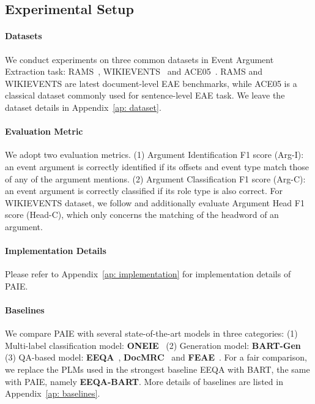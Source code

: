 \subsection{Experimental Setup}
\paragraph{Datasets}
We conduct experiments on three common datasets in Event Argument Extraction task: RAMS~\cite{ebner-etal-2020-multi}, WIKIEVENTS~\cite{li-etal-2021-document} and ACE05~\cite{doddington-etal-2004-automatic}. RAMS and WIKIEVENTS are latest document-level EAE benchmarks, while ACE05 is a classical dataset commonly used for sentence-level EAE task. We leave the dataset details in Appendix~\ref{ap: dataset}.

\paragraph{Evaluation Metric}
We adopt two evaluation metrics. 
(1) Argument Identification F1 score (Arg-I): an event argument is correctly identified if its offsets and event type match those of any of the argument mentions. 
(2) Argument Classification F1 score (Arg-C): an event argument is correctly classified if its role type is also correct. For WIKIEVENTS dataset, we follow \cite{li-etal-2021-document} and additionally evaluate Argument Head F1 score (Head-C), which only concerns the matching of the headword of an argument.

\paragraph{Implementation Details} 
Please refer to Appendix~\ref{ap: implementation} for implementation details of PAIE.

\paragraph{Baselines}
We compare PAIE with several state-of-the-art models in three categories:
(1) Multi-label classification model: \textbf{ONEIE}~\cite{lin-etal-2020-joint} 
(2) Generation model: \textbf{BART-Gen}~\cite{li-etal-2021-document}
(3) QA-based model: \textbf{EEQA}~\cite{du-cardie-2020-event},  \textbf{DocMRC}~\cite{liu-etal-2021-machine} and \textbf{FEAE}~\cite{wei-etal-2021-trigger}.
For a fair comparison, we replace the PLMs used in the strongest baseline EEQA with BART, the same with PAIE, namely \textbf{EEQA-BART}. 
More details of baselines are listed in Appendix~\ref{ap: baselines}.


